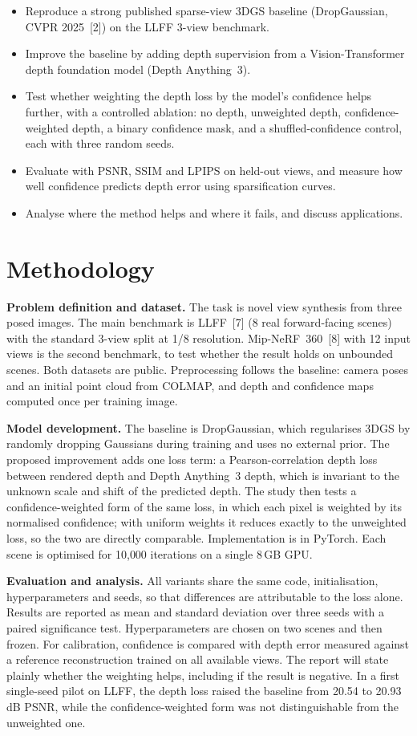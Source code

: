 \documentclass[11pt,a4paper]{article}
\begin{document}
\begin{itemize}
\item Reproduce a strong published sparse-view 3DGS baseline (DropGaussian, CVPR 2025~[2]) on the LLFF 3-view benchmark.
\item Improve the baseline by adding depth supervision from a Vision-Transformer depth foundation model (Depth Anything~3).
\item Test whether weighting the depth loss by the model's confidence helps further, with a controlled ablation: no depth, unweighted depth, confidence-weighted depth, a binary confidence mask, and a shuffled-confidence control, each with three random seeds.
\item Evaluate with PSNR, SSIM and LPIPS on held-out views, and measure how well confidence predicts depth error using sparsification curves.
\item Analyse where the method helps and where it fails, and discuss applications.
\end{itemize}

\section{Methodology}

\textbf{Problem definition and dataset.} The task is novel view synthesis from three posed images. The main benchmark is LLFF~[7] (8 real forward-facing scenes) with the standard 3-view split at 1/8 resolution. Mip-NeRF~360~[8] with 12 input views is the second benchmark, to test whether the result holds on unbounded scenes. Both datasets are public. Preprocessing follows the baseline: camera poses and an initial point cloud from COLMAP, and depth and confidence maps computed once per training image.

\textbf{Model development.} The baseline is DropGaussian, which regularises 3DGS by randomly dropping Gaussians during training and uses no external prior. The proposed improvement adds one loss term: a Pearson-correlation depth loss between rendered depth and Depth Anything~3 depth, which is invariant to the unknown scale and shift of the predicted depth. The study then tests a confidence-weighted form of the same loss, in which each pixel is weighted by its normalised confidence; with uniform weights it reduces exactly to the unweighted loss, so the two are directly comparable. Implementation is in PyTorch. Each scene is optimised for 10{,}000 iterations on a single 8\,GB GPU.

\textbf{Evaluation and analysis.} All variants share the same code, initialisation, hyperparameters and seeds, so that differences are attributable to the loss alone. Results are reported as mean and standard deviation over three seeds with a paired significance test. Hyperparameters are chosen on two scenes and then frozen. For calibration, confidence is compared with depth error measured against a reference reconstruction trained on all available views. The report will state plainly whether the weighting helps, including if the result is negative. In a first single-seed pilot on LLFF, the depth loss raised the baseline from 20.54 to 20.93\,dB PSNR, while the confidence-weighted form was not distinguishable from the unweighted one.
\end{document}
